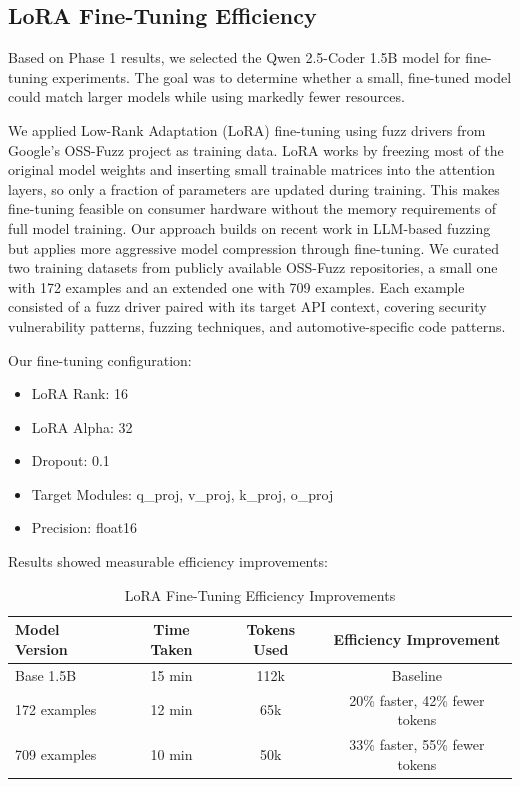 \subsection{LoRA Fine-Tuning Efficiency}
\label{sec:results_lora_efficiency}

Based on Phase 1 results, we selected the Qwen 2.5-Coder 1.5B model for fine-tuning experiments. The goal was to determine whether a small, fine-tuned model could match larger models while using markedly fewer resources.

We applied Low-Rank Adaptation (LoRA) \cite{Hu2021} fine-tuning using fuzz drivers from Google's OSS-Fuzz project as training data. LoRA works by freezing most of the original model weights and inserting small trainable matrices into the attention layers, so only a fraction of parameters are updated during training. This makes fine-tuning feasible on consumer hardware without the memory requirements of full model training. Our approach builds on recent work in LLM-based fuzzing \cite{llm4fuzz,TitanFuzz2022} but applies more aggressive model compression through fine-tuning. We curated two training datasets from publicly available OSS-Fuzz repositories, a small one with 172 examples and an extended one with 709 examples. Each example consisted of a fuzz driver paired with its target API context, covering security vulnerability patterns, fuzzing techniques, and automotive-specific code patterns.

Our fine-tuning configuration:
\begin{itemize}
    \item LoRA Rank: 16
    \item LoRA Alpha: 32
    \item Dropout: 0.1
    \item Target Modules: q\_proj, v\_proj, k\_proj, o\_proj
    \item Precision: float16
\end{itemize}

Results showed measurable efficiency improvements:

\begin{table}[htbp]
\centering
\caption{LoRA Fine-Tuning Efficiency Improvements}
\label{tab:lora_efficiency}
\small
\begin{tabular}{lccc}
\toprule
Model Version & Time Taken & Tokens Used & Efficiency Improvement \\
\midrule
Base 1.5B & 15 min & 112k & Baseline \\
172 examples & 12 min & 65k & 20\% faster, 42\% fewer tokens \\
709 examples & 10 min & 50k & 33\% faster, 55\% fewer tokens \\
\bottomrule
\end{tabular}
\end{table}

